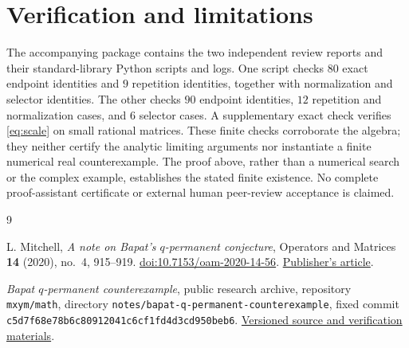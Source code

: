 \documentclass[11pt]{article}
\theoremstyle{remark}
\begin{document}
\section*{Verification and limitations}
The accompanying package contains the two independent review reports and their standard-library Python scripts and logs. One script checks $80$ exact endpoint identities and $9$ repetition identities, together with normalization and selector identities. The other checks $90$ endpoint identities, $12$ repetition and normalization cases, and $6$ selector cases. A supplementary exact check verifies \eqref{eq:scale} on small rational matrices. These finite checks corroborate the algebra; they neither certify the analytic limiting arguments nor instantiate a finite numerical real counterexample. The proof above, rather than a numerical search or the complex example, establishes the stated finite existence. No complete proof-assistant certificate or external human peer-review acceptance is claimed.

\begin{thebibliography}{9}
\raggedright
{}
L. Mitchell, \emph{A note on Bapat's $q$-permanent conjecture},
Operators and Matrices \textbf{14} (2020), no.~4, 915--919.
\href{https://doi.org/10.7153/oam-2020-14-56}{doi:10.7153/oam-2020-14-56}.
\href{https://files.ele-math.com/articles/oam-14-56.pdf}{Publisher's article}.

\emph{Bapat $q$-permanent counterexample}, public research archive,
repository \texttt{mxym/math}, directory
\texttt{notes/bapat-q-permanent-counterexample}, fixed commit
\texttt{c5d7f68e78b6c80912041c6cf1fd4d3cd950beb6}.
\href{https://github.com/mxym/math/tree/c5d7f68e78b6c80912041c6cf1fd4d3cd950beb6/notes/bapat-q-permanent-counterexample}{Versioned source and verification materials}.
\end{thebibliography}
\end{document}
